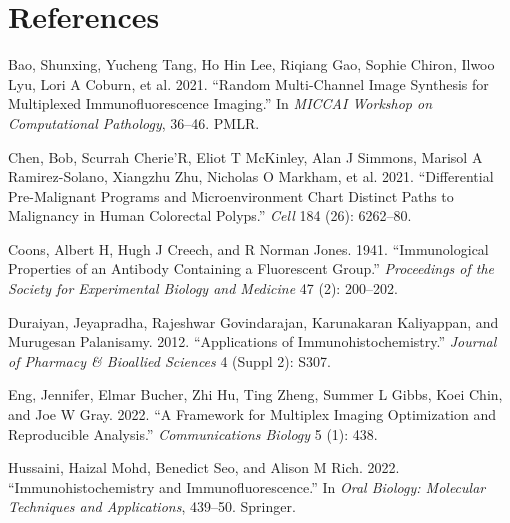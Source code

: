 \documentclass[
  letterpaper,
  DIV=11,
  numbers=noendperiod,
  oneside]{scrreprt}
\newlength{\cslhangindent}
\newlength{\cslentryspacingunit} %
\newenvironment{CSLReferences}[2] %
 {%
  \setlength{\parindent}{0pt}
  \ifodd #1
  \let\oldpar\par
  \def\par{\hangindent=\cslhangindent\oldpar}
  \fi
  \setlength{\parskip}{#2\cslentryspacingunit}
 }%
 {}
\begin{document}

\hypertarget{references}{%
\chapter*{References}\label{references}}


\hypertarget{refs}{}
\begin{CSLReferences}{1}{0}
\leavevmode{}%
Bao, Shunxing, Yucheng Tang, Ho Hin Lee, Riqiang Gao, Sophie Chiron,
Ilwoo Lyu, Lori A Coburn, et al. 2021. {``Random Multi-Channel Image
Synthesis for Multiplexed Immunofluorescence Imaging.''} In \emph{MICCAI
Workshop on Computational Pathology}, 36--46. PMLR.

\leavevmode{}%
Chen, Bob, Scurrah Cherie'R, Eliot T McKinley, Alan J Simmons, Marisol A
Ramirez-Solano, Xiangzhu Zhu, Nicholas O Markham, et al. 2021.
{``Differential Pre-Malignant Programs and Microenvironment Chart
Distinct Paths to Malignancy in Human Colorectal Polyps.''} \emph{Cell}
184 (26): 6262--80.

\leavevmode{}%
Coons, Albert H, Hugh J Creech, and R Norman Jones. 1941.
{``Immunological Properties of an Antibody Containing a Fluorescent
Group.''} \emph{Proceedings of the Society for Experimental Biology and
Medicine} 47 (2): 200--202.

\leavevmode{}%
Duraiyan, Jeyapradha, Rajeshwar Govindarajan, Karunakaran Kaliyappan,
and Murugesan Palanisamy. 2012. {``Applications of
Immunohistochemistry.''} \emph{Journal of Pharmacy \& Bioallied
Sciences} 4 (Suppl 2): S307.

\leavevmode{}%
Eng, Jennifer, Elmar Bucher, Zhi Hu, Ting Zheng, Summer L Gibbs, Koei
Chin, and Joe W Gray. 2022. {``A Framework for Multiplex Imaging
Optimization and Reproducible Analysis.''} \emph{Communications Biology}
5 (1): 438.

\leavevmode{}%
Hussaini, Haizal Mohd, Benedict Seo, and Alison M Rich. 2022.
{``Immunohistochemistry and Immunofluorescence.''} In \emph{Oral
Biology: Molecular Techniques and Applications}, 439--50. Springer.


\end{CSLReferences}
\end{document}
